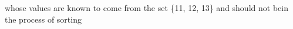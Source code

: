 \documentclass[preview]{standalone}
\begin{document}
\begin{center}
whose values are known to come from the set \{11, 12, 13\} and should not be\noverwritten in the process of sorting
\end{center}
\end{document}
